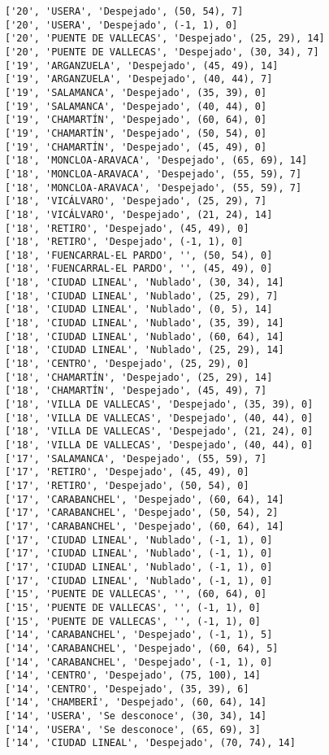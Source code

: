 \documentclass[11pt]{article}
\begin{document}
\begin{Verbatim}[commandchars=\\\{\}]
['20', 'USERA', 'Despejado', (50, 54), 7]
['20', 'USERA', 'Despejado', (-1, 1), 0]
['20', 'PUENTE DE VALLECAS', 'Despejado', (25, 29), 14]
['20', 'PUENTE DE VALLECAS', 'Despejado', (30, 34), 7]
['19', 'ARGANZUELA', 'Despejado', (45, 49), 14]
['19', 'ARGANZUELA', 'Despejado', (40, 44), 7]
['19', 'SALAMANCA', 'Despejado', (35, 39), 0]
['19', 'SALAMANCA', 'Despejado', (40, 44), 0]
['19', 'CHAMARTÍN', 'Despejado', (60, 64), 0]
['19', 'CHAMARTÍN', 'Despejado', (50, 54), 0]
['19', 'CHAMARTÍN', 'Despejado', (45, 49), 0]
['18', 'MONCLOA-ARAVACA', 'Despejado', (65, 69), 14]
['18', 'MONCLOA-ARAVACA', 'Despejado', (55, 59), 7]
['18', 'MONCLOA-ARAVACA', 'Despejado', (55, 59), 7]
['18', 'VICÁLVARO', 'Despejado', (25, 29), 7]
['18', 'VICÁLVARO', 'Despejado', (21, 24), 14]
['18', 'RETIRO', 'Despejado', (45, 49), 0]
['18', 'RETIRO', 'Despejado', (-1, 1), 0]
['18', 'FUENCARRAL-EL PARDO', '', (50, 54), 0]
['18', 'FUENCARRAL-EL PARDO', '', (45, 49), 0]
['18', 'CIUDAD LINEAL', 'Nublado', (30, 34), 14]
['18', 'CIUDAD LINEAL', 'Nublado', (25, 29), 7]
['18', 'CIUDAD LINEAL', 'Nublado', (0, 5), 14]
['18', 'CIUDAD LINEAL', 'Nublado', (35, 39), 14]
['18', 'CIUDAD LINEAL', 'Nublado', (60, 64), 14]
['18', 'CIUDAD LINEAL', 'Nublado', (25, 29), 14]
['18', 'CENTRO', 'Despejado', (25, 29), 0]
['18', 'CHAMARTÍN', 'Despejado', (25, 29), 14]
['18', 'CHAMARTÍN', 'Despejado', (45, 49), 7]
['18', 'VILLA DE VALLECAS', 'Despejado', (35, 39), 0]
['18', 'VILLA DE VALLECAS', 'Despejado', (40, 44), 0]
['18', 'VILLA DE VALLECAS', 'Despejado', (21, 24), 0]
['18', 'VILLA DE VALLECAS', 'Despejado', (40, 44), 0]
['17', 'SALAMANCA', 'Despejado', (55, 59), 7]
['17', 'RETIRO', 'Despejado', (45, 49), 0]
['17', 'RETIRO', 'Despejado', (50, 54), 0]
['17', 'CARABANCHEL', 'Despejado', (60, 64), 14]
['17', 'CARABANCHEL', 'Despejado', (50, 54), 2]
['17', 'CARABANCHEL', 'Despejado', (60, 64), 14]
['17', 'CIUDAD LINEAL', 'Nublado', (-1, 1), 0]
['17', 'CIUDAD LINEAL', 'Nublado', (-1, 1), 0]
['17', 'CIUDAD LINEAL', 'Nublado', (-1, 1), 0]
['17', 'CIUDAD LINEAL', 'Nublado', (-1, 1), 0]
['15', 'PUENTE DE VALLECAS', '', (60, 64), 0]
['15', 'PUENTE DE VALLECAS', '', (-1, 1), 0]
['15', 'PUENTE DE VALLECAS', '', (-1, 1), 0]
['14', 'CARABANCHEL', 'Despejado', (-1, 1), 5]
['14', 'CARABANCHEL', 'Despejado', (60, 64), 5]
['14', 'CARABANCHEL', 'Despejado', (-1, 1), 0]
['14', 'CENTRO', 'Despejado', (75, 100), 14]
['14', 'CENTRO', 'Despejado', (35, 39), 6]
['14', 'CHAMBERÍ', 'Despejado', (60, 64), 14]
['14', 'USERA', 'Se desconoce', (30, 34), 14]
['14', 'USERA', 'Se desconoce', (65, 69), 3]
['14', 'CIUDAD LINEAL', 'Despejado', (70, 74), 14]

\end{Verbatim}
\end{document}
